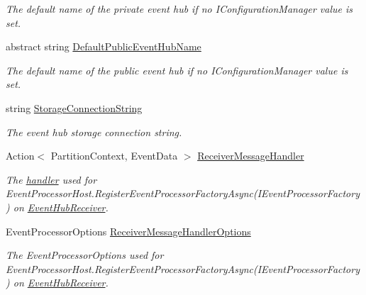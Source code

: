 \begin{DoxyCompactItemize}
\begin{DoxyCompactList}\small\item\em The default name of the private event hub if no I\+Configuration\+Manager value is set. \end{DoxyCompactList}\item 
abstract string \hyperlink{classCqrs_1_1Azure_1_1ServiceBus_1_1AzureEventHub_a11645c85a3c749ca664480867c6fae3c_a11645c85a3c749ca664480867c6fae3c}{Default\+Public\+Event\+Hub\+Name}
\begin{DoxyCompactList}\small\item\em The default name of the public event hub if no I\+Configuration\+Manager value is set. \end{DoxyCompactList}\item 
string \hyperlink{classCqrs_1_1Azure_1_1ServiceBus_1_1AzureEventHub_a2b102538e8b72f9990578fa3bcbe4c12_a2b102538e8b72f9990578fa3bcbe4c12}{Storage\+Connection\+String}
\begin{DoxyCompactList}\small\item\em The event hub storage connection string. \end{DoxyCompactList}\item 
Action$<$ Partition\+Context, Event\+Data $>$ \hyperlink{classCqrs_1_1Azure_1_1ServiceBus_1_1AzureEventHub_a8c9faa7096d72a45803e6e63a1b3cf30_a8c9faa7096d72a45803e6e63a1b3cf30}{Receiver\+Message\+Handler}
\begin{DoxyCompactList}\small\item\em The \hyperlink{}{handler} used for Event\+Processor\+Host.\+Register\+Event\+Processor\+Factory\+Async(\+I\+Event\+Processor\+Factory) on \hyperlink{classCqrs_1_1Azure_1_1ServiceBus_1_1AzureEventHub_a1b12b47dbb9b9afe2014477a2e457c35_a1b12b47dbb9b9afe2014477a2e457c35}{Event\+Hub\+Receiver}. \end{DoxyCompactList}\item 
Event\+Processor\+Options \hyperlink{classCqrs_1_1Azure_1_1ServiceBus_1_1AzureEventHub_ad3a0c2f32d5771fb1f4420fc33c75968_ad3a0c2f32d5771fb1f4420fc33c75968}{Receiver\+Message\+Handler\+Options}
\begin{DoxyCompactList}\small\item\em The Event\+Processor\+Options used for Event\+Processor\+Host.\+Register\+Event\+Processor\+Factory\+Async(\+I\+Event\+Processor\+Factory) on \hyperlink{classCqrs_1_1Azure_1_1ServiceBus_1_1AzureEventHub_a1b12b47dbb9b9afe2014477a2e457c35_a1b12b47dbb9b9afe2014477a2e457c35}{Event\+Hub\+Receiver}. \end{DoxyCompactList}\item 

\end{DoxyCompactItemize}
